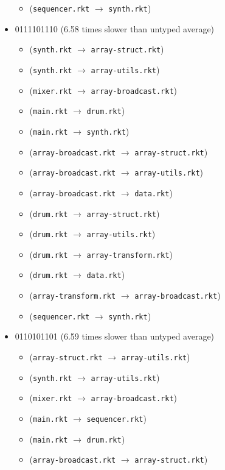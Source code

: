 \documentclass{article}
\newcommand{\mono}[1]{\texttt{#1}}
\begin{document}
\begin{itemize}
\begin{itemize}
  \item (\mono{sequencer.rkt} $\rightarrow$ \mono{synth.rkt})
  \end{itemize}
\item 0111101110 (6.58 times slower than untyped average)
  \begin{itemize}
  \item (\mono{synth.rkt} $\rightarrow$ \mono{array-struct.rkt})
  \item (\mono{synth.rkt} $\rightarrow$ \mono{array-utils.rkt})
  \item (\mono{mixer.rkt} $\rightarrow$ \mono{array-broadcast.rkt})
  \item (\mono{main.rkt} $\rightarrow$ \mono{drum.rkt})
  \item (\mono{main.rkt} $\rightarrow$ \mono{synth.rkt})
  \item (\mono{array-broadcast.rkt} $\rightarrow$ \mono{array-struct.rkt})
  \item (\mono{array-broadcast.rkt} $\rightarrow$ \mono{array-utils.rkt})
  \item (\mono{array-broadcast.rkt} $\rightarrow$ \mono{data.rkt})
  \item (\mono{drum.rkt} $\rightarrow$ \mono{array-struct.rkt})
  \item (\mono{drum.rkt} $\rightarrow$ \mono{array-utils.rkt})
  \item (\mono{drum.rkt} $\rightarrow$ \mono{array-transform.rkt})
  \item (\mono{drum.rkt} $\rightarrow$ \mono{data.rkt})
  \item (\mono{array-transform.rkt} $\rightarrow$ \mono{array-broadcast.rkt})
  \item (\mono{sequencer.rkt} $\rightarrow$ \mono{synth.rkt})
  \end{itemize}
\item 0110101101 (6.59 times slower than untyped average)
  \begin{itemize}
  \item (\mono{array-struct.rkt} $\rightarrow$ \mono{array-utils.rkt})
  \item (\mono{synth.rkt} $\rightarrow$ \mono{array-utils.rkt})
  \item (\mono{mixer.rkt} $\rightarrow$ \mono{array-broadcast.rkt})
  \item (\mono{main.rkt} $\rightarrow$ \mono{sequencer.rkt})
  \item (\mono{main.rkt} $\rightarrow$ \mono{drum.rkt})
  \item (\mono{array-broadcast.rkt} $\rightarrow$ \mono{array-struct.rkt})

\end{itemize}
\end{itemize}
\end{document}
